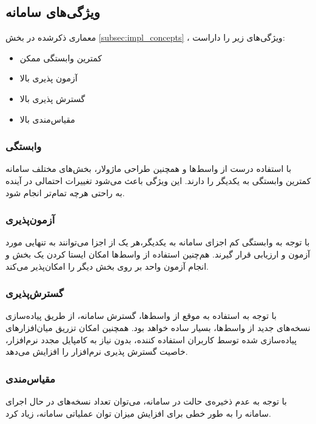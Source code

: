 \subsection{ویژگی‌های سامانه}\label{subsec:impl_features}
معماری ذکر‌شده در بخش
\ref{subsec:impl_concepts}
، ویژگی‌های زیر را داراست:

\begin{itemize}
    \item کمترین وابستگی ممکن
    \item آزمون پذیری بالا
    \item گسترش پذیری بالا
    \item مقیاس‌مندی بالا
\end{itemize}

\subsubsection{وابستگی}
با استفاده درست از واسط‌ها و همچنین طراحی ماژولار، بخش‌های مختلف سامانه کمترین وابستگی به یکدیگر را دارند. این ویژگی باعث می‌شود تغییرات احتمالی در آینده به راحتی هرچه تمام‌تر انجام شود.

\subsubsection{آزمون‌پذیری}
با توجه به وابستگی کم اجزای سامانه به یکدیگر،‌هر یک از اجزا می‌توانند به تنهایی مورد آزمون و ارزیابی قرار گیرند.
هم‌چنین استفاده از واسط‌ها امکان ایستا کردن یک بخش و انجام آزمون واحد
بر روی بخش دیگر را امکان‌پذیر می‌کند.

\subsubsection{گسترش‌پذیری}
با توجه به استفاده به موقع از واسط‌ها، گسترش سامانه،‌ از طریق پیاده‌سازی نسخه‌های جدید از واسط‌ها، بسیار ساده خواهد بود. همچنین امکان تزریق میان‌افزار‌های پیاده‌سازی شده توسط کاربران استفاده کننده، بدون نیاز به کامپایل مجدد نرم‌افزار، خاصیت گسترش پذیری نرم‌افزار را افزایش می‌دهد.

\subsubsection{مقیاس‌مندی}
با توجه به عدم ذخیره‌ی حالت در سامانه، می‌توان تعداد نسخه‌های در حال اجرای سامانه‌ را به طور خطی برای افزایش میزان توان عملیاتی سامانه، زیاد کرد.

\cleardoublepage 
